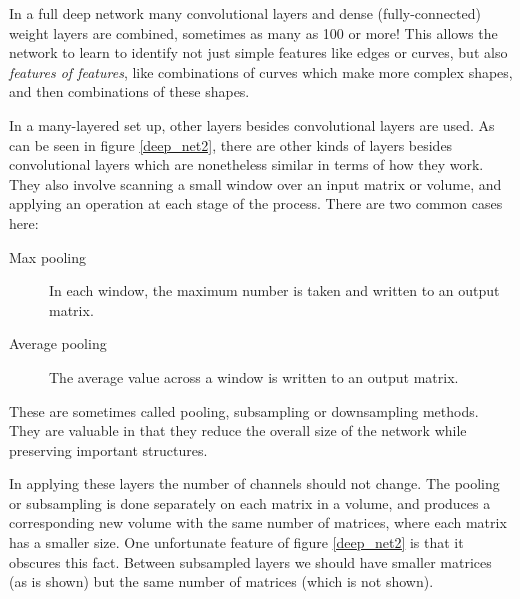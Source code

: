 
In a full deep network many convolutional layers and dense (fully-connected) weight layers are combined, sometimes as many as 100 or more! This allows the network to learn to identify not just simple features like edges or curves, but also \emph{features of features}, like combinations of curves which make more complex shapes, and then combinations of these shapes. 

In a many-layered set up, other layers besides convolutional layers are used. As can be seen in figure \ref{deep_net2}, there are other kinds of layers besides convolutional layers which are nonetheless similar in terms of how they work.  They also involve scanning a small window over an input matrix or volume, and applying an operation at each stage of the process. There are two common cases here:

\begin{description}
\item[Max pooling] In each window, the maximum number is taken and written to an output matrix.
\item[Average pooling] The average value across a window is written to an output matrix.
\end{description}

These are sometimes called pooling, subsampling or downsampling methods. They are valuable in that they reduce the overall size of the network while preserving important structures.

In applying these layers the number of channels should not change. The pooling or subsampling is done separately on each matrix in a volume, and produces a corresponding new volume with the same number of matrices, where each matrix has a smaller size. One unfortunate feature of figure \ref{deep_net2} is that it obscures this fact. Between subsampled layers we should have smaller matrices (as is shown) but the same number of matrices (which is not shown).

